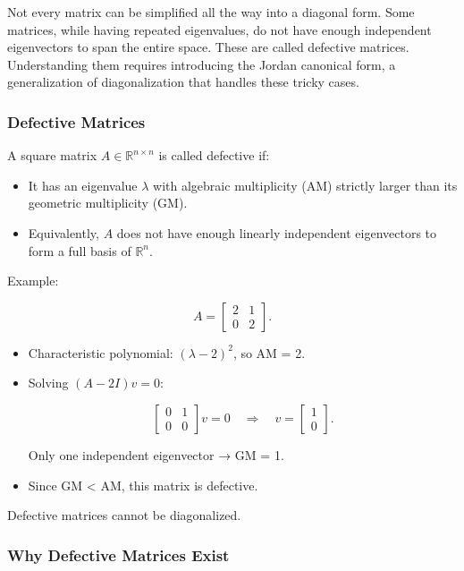 \documentclass[
  letterpaper,
  DIV=11,
  numbers=noendperiod]{scrreprt}
\providecommand{\tightlist}{%
  \setlength{\itemsep}{0pt}\setlength{\parskip}{0pt}}
\begin{document}
Not every matrix can be simplified all the way into a diagonal form.
Some matrices, while having repeated eigenvalues, do not have enough
independent eigenvectors to span the entire space. These are called
defective matrices. Understanding them requires introducing the Jordan
canonical form, a generalization of diagonalization that handles these
tricky cases.

\subsubsection{Defective Matrices}\label{defective-matrices}

A square matrix \(A \in \mathbb{R}^{n \times n}\) is called defective
if:

\begin{itemize}
\tightlist
\item
  It has an eigenvalue \(\lambda\) with algebraic multiplicity (AM)
  strictly larger than its geometric multiplicity (GM).
\item
  Equivalently, \(A\) does not have enough linearly independent
  eigenvectors to form a full basis of \(\mathbb{R}^n\).
\end{itemize}

Example:

\[
A = \begin{bmatrix} 2 & 1 \\ 0 & 2 \end{bmatrix}.
\]

\begin{itemize}
\item
  Characteristic polynomial: \((\lambda - 2)^2\), so AM = 2.
\item
  Solving \((A - 2I)v = 0\):

  \[
  \begin{bmatrix} 0 & 1 \\ 0 & 0 \end{bmatrix}v = 0 \quad \Rightarrow \quad v = \begin{bmatrix} 1 \\ 0 \end{bmatrix}.
  \]

  Only one independent eigenvector → GM = 1.
\item
  Since GM \textless{} AM, this matrix is defective.
\end{itemize}

Defective matrices cannot be diagonalized.

\subsubsection{Why Defective Matrices
Exist}\label{why-defective-matrices-exist}
\end{document}
